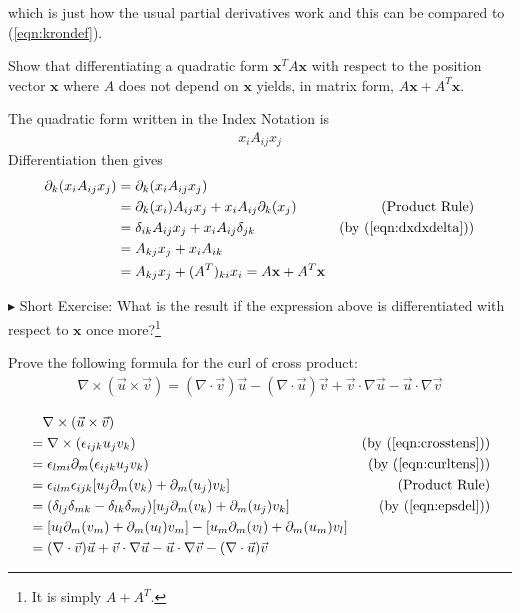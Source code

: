 which is just how the usual partial derivatives work and this can be compared to (\ref{eqn:krondef}).
\begin{exmp}
Show that differentiating a quadratic form $\textbf{x}^TA\textbf{x}$ with respect to the position vector $\textbf{x}$ where $A$ does not depend on $\textbf{x}$ yields, in matrix form, $A\textbf{x} + A^T\textbf{x}$.
\end{exmp}
\begin{solution}
The quadratic form written in the Index Notation is
\begin{align*}
x_iA_{ij}x_j
\end{align*}
Differentiation then gives
\begin{align*}
\partial_k (x_iA_{ij}x_j) &= \partial_k (x_iA_{ij}x_j) \\
&= \partial_k (x_i) A_{ij}x_j + x_iA_{ij} \partial_k (x_j) & \text{(Product Rule)} \\
&= \delta_{ik} A_{ij}x_j + x_iA_{ij} \delta_{jk} & \text{(by (\ref{eqn:dxdxdelta}))} \\
&= A_{kj}x_j + x_iA_{ik} \\
&= A_{kj}x_j + (A^T)_{ki}x_i = A\textbf{x} + A^T\textbf{x}
\end{align*}
\end{solution}
$\blacktriangleright$ Short Exercise: What is the result if the expression above is differentiated with respect to $\textbf{x}$ once more?\footnote{It is simply $A+A^T$.}

\begin{exmp}
Prove the following formula for the curl of cross product:
\begin{align}
\nabla \times (\vec{u} \times \vec{v}) = (\nabla \cdot \vec{v})\vec{u} - (\nabla \cdot \vec{u})\vec{v}  + \vec{v} \cdot \nabla\vec{u} - \vec{u} \cdot \nabla\vec{v} 
\end{align}
\end{exmp}
\begin{solution}
\begin{align*}
&\quad \nabla \times (\vec{u} \times \vec{v}) \\
&= \nabla \times (\epsilon_{ijk}u_jv_k) &\text{(by (\ref{eqn:crosstens}))} \\
&= \epsilon_{lmi}\partial_m (\epsilon_{ijk}u_jv_k) &\text{(by (\ref{eqn:curltens}))} \\
&= \epsilon_{ilm}\epsilon_{ijk} [u_j\partial_m(v_k) + \partial_m(u_j)v_k] &\text{(Product Rule)} \\
&= (\delta_{lj}\delta_{mk} - \delta_{lk}\delta_{mj}) [u_j\partial_m(v_k) + \partial_m(u_j)v_k] &\text{(by (\ref{eqn:epsdel}))} \\
&= [u_l\partial_m(v_m) + \partial_m(u_l)v_m] - [u_m\partial_m(v_l) + \partial_m(u_m)v_l] \\
&= (\nabla \cdot \vec{v})\vec{u} + \vec{v} \cdot \nabla\vec{u} - \vec{u} \cdot \nabla\vec{v} - (\nabla \cdot \vec{u})\vec{v}
\end{align*}
\end{solution}

